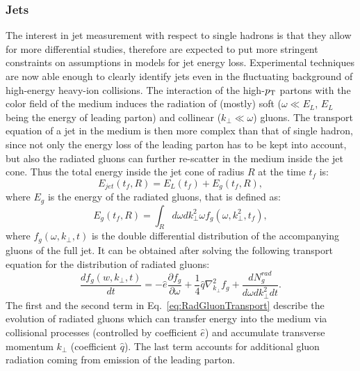 \subsubsection{Jets}
The interest in jet measurement with respect to single hadrons is that they allow for more differential studies, therefore are expected to put more stringent constraints on assumptions in models for jet energy loss. Experimental techniques are now able enough to clearly identify jets even in the fluctuating background of high-energy heavy-ion collisions. The interaction of the high-$p_{\rm T}$ partons with the color field of the medium induces the radiation of (mostly) soft ($\omega \ll E_{L}$, $E_L$ being the energy of leading parton) and collinear ($k_{\perp} \ll \omega$) gluons. The transport equation of a jet in the medium is then more complex than that of single hadron, since not only the energy loss of the leading parton has to be kept into account, but also the radiated gluons can further re-scatter in the medium inside the jet cone. Thus the total energy inside the jet cone of radius $R$ at the time $t_f$ is:
\begin{equation}
\label{eq:EnergyJet}
E_{jet}(t_f,R) = E_L(t_f) +E_g(t_f,R),
\end{equation}
where $E_g$ is the energy of the radiated gluons, that is defined as:
\begin{equation}
\label{eq:Eg}
E_g(t_f,R) = \int_R d\omega dk^2_\perp \omega f_g(\omega,k^2_\perp,t_f),
\end{equation}
where $f_g(\omega,k_{\perp},t)$ is the double differential distribution of the accompanying gluons of the full jet. It can be obtained after solving the following transport equation for the distribution of radiated gluons:
\begin{equation}
\label{eq:RadGluonTransport}
\frac{df_g(w,k_{\perp},t)}{dt} = -\hat{e}\frac{\partial f_g}{\partial \omega} + \frac{1}{4}\hat{q}\nabla^2_{k_{\perp}}f_g + \frac{dN^{rad}_g}{d\omega dk^2_{\perp} dt}.
\end{equation}
The first and the second term in Eq.~\ref{eq:RadGluonTransport} describe the evolution of radiated gluons which can transfer energy into the medium via collisional processes (controlled by coefficient $\hat{e}$) and accumulate transverse momentum $k_\perp$ (coefficient $\hat{q}$). The last term accounts for additional gluon radiation coming from emission of the leading parton.\\
